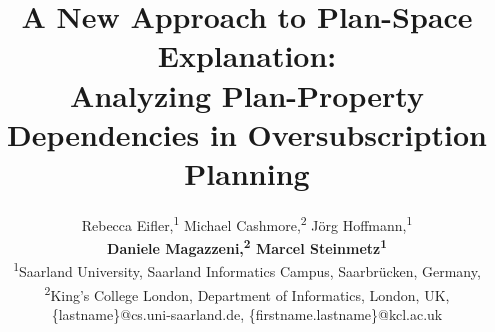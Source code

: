 \documentclass[letterpaper]{article} %
\begin{document}
\title{A New Approach to Plan-Space Explanation:\\ Analyzing Plan-Property Dependencies in Oversubscription Planning}


\author{
Rebecca Eifler,\textsuperscript{\rm 1} 
Michael Cashmore,\textsuperscript{\rm 2}
J\"org Hoffmann,\textsuperscript{\rm 1}\\
\Large \textbf{Daniele Magazzeni,\textsuperscript{\rm 2} 
Marcel Steinmetz\textsuperscript{\rm 1}} \\
\textsuperscript{\rm 1}Saarland University, Saarland Informatics Campus, Saarbr\"ucken, Germany,\\ 
\textsuperscript{\rm 2}King's College London, Department of Informatics, London, UK,\\ 
\{lastname\}@cs.uni-saarland.de,
\{firstname.lastname\}@kcl.ac.uk 
}

\maketitle
\end{document}
